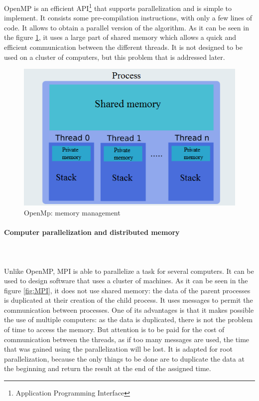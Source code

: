 OpenMP is an efficient API\footnote{Application Programming Interface} that supports parallelization and is simple to implement. It consists some pre-compilation instructions, with only a few lines of code. It allows to obtain a parallel version of the algorithm. As it can be seen in the figure \ref{fig:OpenMp}, it uses a large part of shared memory which allows a quick and efficient communication between the different threads. It is not designed to be used on a cluster of computers, but this problem that is addressed later.
\begin{figure}[!h] 
\centerline{\includegraphics[scale=0.50]{3_Software_considered/MultithreadingMP_boost_Visual_MPI_5000_Zotero_Project_Baptiste/OpenMP}}
   \caption{\label{étiquette} OpenMp: memory management}
\label{fig:OpenMp}
\end{figure}
\newpage
\paragraph{Computer parallelization and distributed memory}\mbox{}\\\mbox{}\\

Unlike OpenMP, MPI is able to parallelize a task for several computers. It can be used to design software that uses a cluster of machines. As it can be seen in the figure \ref{fig:MPI}, it does not use shared memory: the data of the parent processes is duplicated at their creation of the child process. It uses messages to permit the communication between processes. One of its advantages is that it makes possible the use of multiple computers: as the data is duplicated, there is not the problem of time to access the memory. But attention is to be paid for the cost of communication between the threads, as if too many messages are used, the time that was gained using the parallelization will be lost. It is adapted for root parallelization, because the only things to be done are to duplicate the data at the beginning and return the result at the end of the assigned time.

